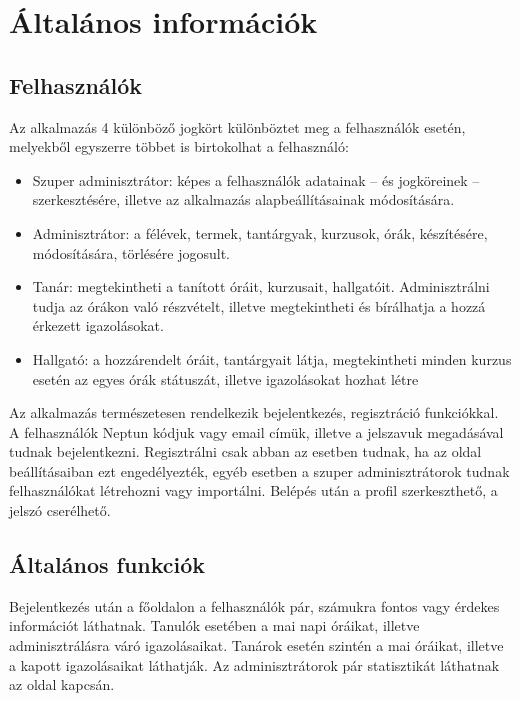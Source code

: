 \documentclass[
]{thesis-ekf}
\theoremstyle{definition}
\theoremstyle{remark}
\begin{document}
\section{Általános információk}

\subsection{Felhasználók}

Az alkalmazás 4 különböző jogkört különböztet meg a felhasználók esetén, melyekből egyszerre többet is birtokolhat a felhasználó:

\begin{itemize}
	\item Szuper adminisztrátor: képes a felhasználók adatainak -- és jogköreinek -- szerkesztésére, illetve az alkalmazás alapbeállításainak módosítására.
	\item Adminisztrátor: a félévek, termek, tantárgyak, kurzusok, órák, készítésére, módosítására, törlésére jogosult.
	\item Tanár: megtekintheti a tanított óráit, kurzusait, hallgatóit. Adminisztrálni tudja az órákon való részvételt, illetve megtekintheti és bírálhatja a hozzá érkezett igazolásokat.
	\item Hallgató: a hozzárendelt óráit, tantárgyait látja, megtekintheti minden kurzus esetén az egyes órák státuszát, illetve igazolásokat hozhat létre
\end{itemize}

Az alkalmazás természetesen rendelkezik bejelentkezés, regisztráció funkciókkal. A felhasználók Neptun\cite{Neptun} kódjuk vagy email címük, illetve a jelszavuk megadásával tudnak bejelentkezni. Regisztrálni csak abban az esetben tudnak, ha az oldal beállításaiban ezt engedélyezték, egyéb esetben a szuper adminisztrátorok tudnak felhasználókat létrehozni vagy importálni. Belépés után  a profil szerkeszthető, a jelszó cserélhető.

\subsection{Általános funkciók}

Bejelentkezés után a főoldalon a felhasználók pár, számukra fontos vagy érdekes információt láthatnak. Tanulók esetében a mai napi óráikat, illetve adminisztrálásra váró igazolásaikat. Tanárok esetén szintén a mai óráikat, illetve a kapott igazolásaikat láthatják. Az adminisztrátorok pár statisztikát láthatnak az oldal kapcsán.
\end{document}
